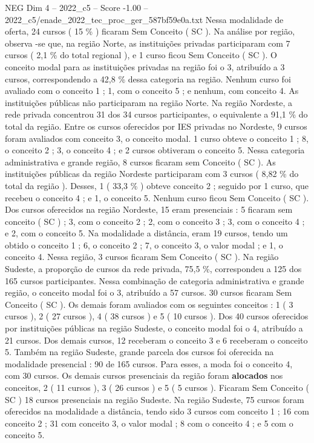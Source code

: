 \begin{textsample}{NEG Dim 4 – 2022\_c5 – Score -1.00 – 2022\_c5/enade\_2022\_tec\_proc\_ger\_587bf59e0a.txt}
Nessa modalidade de oferta, 24 cursos ( 15 \% ) ficaram Sem Conceito ( SC ).
Na análise por região, observa -se que, na região Norte, as instituições privadas participaram com 7 cursos ( 2,1 \% do total regional ), e 1 curso ficou Sem Conceito ( SC ).
O conceito modal para as instituições privadas na região foi o 3, atribuído a 3 cursos, correspondendo a 42,8 \% dessa categoria na região.
Nenhum curso foi avaliado com o conceito 1 ; 1, com o conceito 5 ; e nenhum, com conceito 4.
As instituições públicas não participaram na região Norte.
Na região Nordeste, a rede privada concentrou 31 dos 34 cursos participantes, o equivalente a 91,1 \% do total da região.
Entre os cursos oferecidos por IES privadas no Nordeste, 9 cursos foram avaliados com conceito 3, o conceito modal. 1 curso obteve o conceito 1 ; 8, o conceito 2 ; 3, o conceito 4 ; e 2 cursos obtiveram o conceito 5.
Nessa categoria administrativa e grande região, 8 cursos ficaram sem Conceito ( SC ).
As instituições públicas da região Nordeste participaram com 3 cursos ( 8,82 \% do total da região ).
Desses, 1 ( 33,3 \% ) obteve conceito 2 ; seguido por 1 curso, que recebeu o conceito 4 ; e 1, o conceito 5.
Nenhum curso ficou Sem Conceito ( SC ).
Dos cursos oferecidos na região Nordeste, 15 eram presenciais : 5 ficaram sem conceito ( SC ) ; 3, com o conceito 2 ; 2, com o conceito 3 ; 3, com o conceito 4 ; e 2, com o conceito 5.
Na modalidade a distância, eram 19 cursos, tendo um obtido o conceito 1 ; 6, o conceito 2 ; 7, o conceito 3, o valor modal ; e 1, o conceito 4.
Nessa região, 3 cursos ficaram Sem Conceito ( SC ).
Na região Sudeste, a proporção de cursos da rede privada, 75,5 \%, correspondeu a 125 dos 165 cursos participantes.
Nessa combinação de categoria administrativa e grande região, o conceito modal foi o 3, atribuído a 57 cursos. 30 cursos ficaram Sem Conceito ( SC ).
Os demais foram avaliados com os seguintes conceitos : 1 ( 3 cursos ), 2 ( 27 cursos ), 4 ( 38 cursos ) e 5 ( 10 cursos ).
Dos 40 cursos oferecidos por instituições públicas na região Sudeste, o conceito modal foi o 4, atribuído a 21 cursos.
Dos demais cursos, 12 receberam o conceito 3 e 6 receberam o conceito 5.
Também na região Sudeste, grande parcela dos cursos foi oferecida na modalidade presencial : 90 de 165 cursos.
Para esses, a moda foi o conceito 4, com 30 cursos.
Os demais cursos presenciais da região foram \textbf{alocados} nos conceitos, 2 ( 11 cursos ), 3 ( 26 cursos ) e 5 ( 5 cursos ).
Ficaram Sem Conceito ( SC ) 18 cursos presenciais na região Sudeste.
Na região Sudeste, 75 cursos foram oferecidos na modalidade a distância, tendo sido 3 cursos com conceito 1 ; 16 com conceito 2 ; 31 com conceito 3, o valor modal ; 8 com o conceito 4 ; e 5 com o conceito 5.

\end{textsample}
